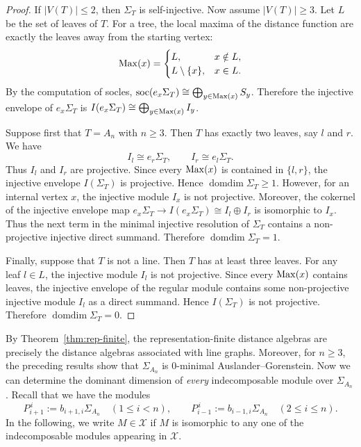 \documentclass[a4paper,leqno]{amsart}
\begin{document}
\begin{proof}
If $|V(T)|\leq 2$, then $\Sigma_T$ is self-injective. Now assume $|V(T)|\geq 3$. Let $L$ be the set of leaves of $T$. For a tree, the local maxima of the distance function are exactly the leaves away from the starting vertex:
$$\operatorname{Max}(x)=
\begin{cases}
L, & x\notin L,\\
L\setminus\{x\}, & x\in L.
\end{cases}$$
By the computation of socles,
$\operatorname{soc} (e_x\Sigma_T)\cong\bigoplus_{y\in \operatorname{Max}(x)}S_y$.
Therefore the injective envelope of $e_x\Sigma_T$ is $I(e_x\Sigma_T)\cong\bigoplus_{y\in \operatorname{Max}(x)}I_y$.

Suppose first that $T=A_n$ with $n\geq 3$. Then $T$ has exactly two leaves, say $l$ and $r$. We have
$$I_l\cong e_r\Sigma_T,\qquad I_r\cong e_l\Sigma_T.$$
Thus $I_l$ and $I_r$ are projective. Since every $\operatorname{Max}(x)$ is contained in $\{l,r\}$, the injective envelope $I(\Sigma_T)$ is projective. Hence $\operatorname{domdim}\Sigma_T\geq 1$. However, for an internal vertex $x$, the injective module $I_x$ is not projective. Moreover, the cokernel of the injective envelope map $e_x\Sigma_T\rightarrow I(e_x\Sigma_T)\cong I_l\oplus I_r$ is isomorphic to $I_x$. Thus the next term in the minimal injective resolution of $\Sigma_T$ contains a non-projective injective direct summand. Therefore $\operatorname{domdim}\Sigma_T=1$.

Finally, suppose that $T$ is not a line. Then $T$ has at least three leaves. For any leaf $l\in L$, the injective module $I_l$ is not projective. 
Since every $\operatorname{Max}(x)$ contains leaves, the injective envelope of the regular module contains some non-projective injective module $I_l$ as a direct summand. Hence $I(\Sigma_T)$ is not projective. Therefore $\operatorname{domdim}\Sigma_T=0$.
\end{proof}


By Theorem~\ref{thm:rep-finite}, the representation-finite distance algebras are precisely the distance algebras associated with line graphs. Moreover, for $n\geq3$, the preceding results show that $\Sigma_{A_n}$ is $0$-minimal Auslander--Gorenstein. 
Now we can determine the dominant dimension of \emph{every} indecomposable module over $\Sigma_{A_n}$. 
Recall that we have the modules
\[
P_{i+1}^{\,i}:=b_{i+1,i}\Sigma_{A_n}
\quad(1\leq i<n),
\qquad
P_{i-1}^{\,i}:=b_{i-1,i}\Sigma_{A_n}
\quad(2\leq i\leq n).
\]
In the following, we write $M\in \mathcal{X}$ if $M$ is isomorphic to any one of the indecomposable modules appearing in $\mathcal{X}$.
\end{document}
